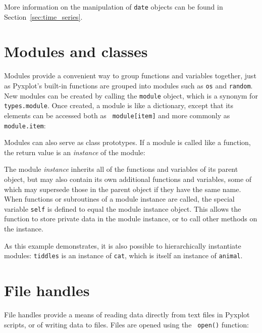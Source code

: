 More information on the manipulation of {\tt date} objects can be found in Section~\ref{sec:time_series}.

\section{Modules and classes}

Modules provide a convenient way to group functions and variables together,
just as Pyxplot's built-in functions are grouped into modules such as {\tt os}
and {\tt random}.  New modules can be created by calling the {\tt module}
object, which is a synonym for {\tt types.module}. Once created, a module is
like a dictionary, except that its elements can be accessed both as {\tt
module[item]} and more commonly as {\tt module.item}:

\vspace{3mm}

\vspace{3mm}

Modules can also serve as class prototypes. If a module is called like a
function, the return value is an {\it instance} of the module:

\vspace{3mm}

\vspace{3mm}

The module {\it instance} inherits all of the functions and variables of its
parent object, but may also contain its own additional functions and variables,
some of which may supersede those in the parent object if they have the same
name. When functions or subroutines of a module instance are called, the
special variable {\tt self} is defined to equal the module instance object.
This allows the function to store private data in the module instance, or to
call other methods on the instance.

\vspace{3mm}

\vspace{3mm}

As this example demonstrates, it is also possible to hierarchically instantiate
modules: {\tt tiddles} is an instance of {\tt cat}, which is itself an instance
of {\tt animal}.

\section{File handles}

File handles provide a means of reading data directly from text files in
Pyxplot scripts, or of writing data to files. Files are opened using the {\tt
open()} function:

